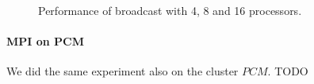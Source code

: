 \begin{figure}[h]
	\caption{Performance of broadcast with 4, 8 and 16 processors.}
	\label{pianosa-mpi-3}
\end{figure}

\clearpage

\paragraph{MPI on PCM}
We did the same experiment also on the cluster $PCM$. TODO

